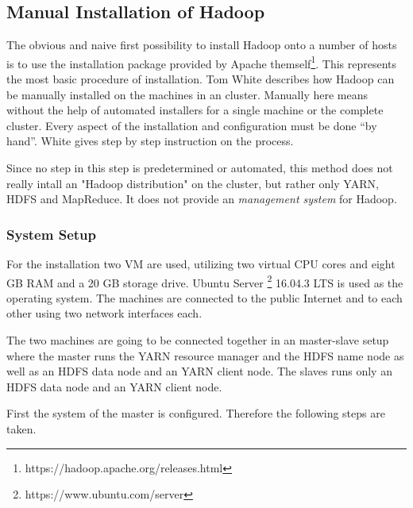 \subsection{Manual Installation of Hadoop}

The obvious and naive first possibility to install Hadoop onto a number of hosts 
is to use the installation package provided by Apache themself\footnote{https://hadoop.apache.org/releases.html}.
This represents the most basic procedure of installation.
Tom White \autocite[][Appendix A]{white2015hadoop} describes how Hadoop can be manually installed on the machines in an cluster. 
Manually here means without the help of automated installers for a single machine or the complete cluster. 
Every aspect of the installation and configuration must be done \enquote{by hand}.
White gives step by step instruction on the process.

Since no step in this step is predetermined or automated, this method does not really intall an "Hadoop distribution" on the cluster, but rather only \ac{YARN}, \ac{HDFS} and MapReduce.
It does not provide an \emph{management system} for Hadoop.

\subsubsection{System Setup}
For the installation two \acs{VM} are used, utilizing two virtual \ac{CPU} cores and eight \ac{GB} \ac{RAM} and a 20 \ac{GB} storage drive. 
Ubuntu Server \footnote{https://www.ubuntu.com/server} 16.04.3 \ac{LTS} is used as the operating system. 
The machines are connected to the public Internet and to each other using two network interfaces each.

The two machines are going to be connected together in an master-slave setup
where the master runs the \ac{YARN} resource manager and the \ac{HDFS} name node as well as an \ac{HDFS} data node and an \ac{YARN} client node.
The slaves runs only an \ac{HDFS} data node and an \ac{YARN} client node.

First the system of the master is configured. Therefore the following steps are taken.

